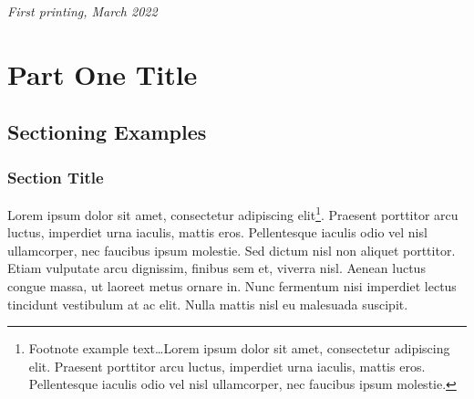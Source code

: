 \documentclass[
	11pt, %
	fleqn, %
	a4paper, %
	oneside, %
]{LegrandOrangeBook}
\begin{document}
\noindent \textit{First printing, March 2022} %


\pagestyle{empty} %

\tableofcontents %



\pagestyle{fancy} %

\cleardoublepage %


\part{Part One Title}


\chapterspaceabove{6.75cm} %
\chapterspacebelow{7.25cm} %


\chapter{Sectioning Examples}

\section{Section Title}

Lorem ipsum dolor sit amet, consectetur adipiscing elit\footnote{Footnote example text\ldots Lorem ipsum dolor sit amet, consectetur adipiscing elit. Praesent porttitor arcu luctus, imperdiet urna iaculis, mattis eros. Pellentesque iaculis odio vel nisl ullamcorper, nec faucibus ipsum molestie.}. Praesent porttitor arcu luctus, imperdiet urna iaculis, mattis eros. Pellentesque iaculis odio vel nisl ullamcorper, nec faucibus ipsum molestie. Sed dictum nisl non aliquet porttitor. Etiam vulputate arcu dignissim, finibus sem et, viverra nisl. Aenean luctus congue massa, ut laoreet metus ornare in. Nunc fermentum nisi imperdiet lectus tincidunt vestibulum at ac elit. Nulla mattis nisl eu malesuada suscipit.
\end{document}

